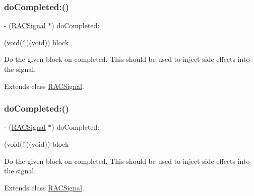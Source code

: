 \subsubsection{\texorpdfstring{do\+Completed\+:()}{doCompleted:()}\hspace{0.1cm}{\footnotesize\ttfamily [1/3]}}
{\footnotesize\ttfamily -\/ (\mbox{\hyperlink{interface_r_a_c_signal}{R\+A\+C\+Signal}} $\ast$) do\+Completed\+: \begin{DoxyParamCaption}\item[{(void($^\wedge$)(void))}]{block }\end{DoxyParamCaption}}

Do the given block on {\ttfamily completed}. This should be used to inject side effects into the signal. 

Extends class \mbox{\hyperlink{interface_r_a_c_signal_af88fe4c330bad925ed164ad8f12bdcc8}{R\+A\+C\+Signal}}.

\mbox{\label{category_r_a_c_signal_07_operations_08_af88fe4c330bad925ed164ad8f12bdcc8}} 
\subsubsection{\texorpdfstring{do\+Completed\+:()}{doCompleted:()}\hspace{0.1cm}{\footnotesize\ttfamily [2/3]}}
{\footnotesize\ttfamily -\/ (\mbox{\hyperlink{interface_r_a_c_signal}{R\+A\+C\+Signal}} $\ast$) do\+Completed\+: \begin{DoxyParamCaption}\item[{(void($^\wedge$)(void))}]{block }\end{DoxyParamCaption}}

Do the given block on {\ttfamily completed}. This should be used to inject side effects into the signal. 

Extends class \mbox{\hyperlink{interface_r_a_c_signal_af88fe4c330bad925ed164ad8f12bdcc8}{R\+A\+C\+Signal}}.

\mbox{\label{category_r_a_c_signal_07_operations_08_af88fe4c330bad925ed164ad8f12bdcc8}} 
